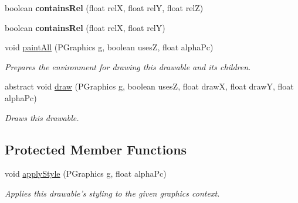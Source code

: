 \begin{DoxyCompactItemize}
\item 
\hypertarget{classhype_1_1core_1_1drawable_1_1_h_drawable_a8ae24b40927238f1be71ad4ff3120874}{boolean {\bfseries contains\-Rel} (float rel\-X, float rel\-Y, float rel\-Z)}\label{classhype_1_1core_1_1drawable_1_1_h_drawable_a8ae24b40927238f1be71ad4ff3120874}

\item 
\hypertarget{classhype_1_1core_1_1drawable_1_1_h_drawable_acd096b75e5eb22539a74db0528bf14a7}{boolean {\bfseries contains\-Rel} (float rel\-X, float rel\-Y)}\label{classhype_1_1core_1_1drawable_1_1_h_drawable_acd096b75e5eb22539a74db0528bf14a7}

\item 
void \hyperlink{classhype_1_1core_1_1drawable_1_1_h_drawable_ac66170a2cfce900a6ffa69696fd7c766}{paint\-All} (P\-Graphics g, boolean uses\-Z, float alpha\-Pc)
\begin{DoxyCompactList}\small\item\em Prepares the environment for drawing this drawable and its children. \end{DoxyCompactList}\item 
abstract void \hyperlink{classhype_1_1core_1_1drawable_1_1_h_drawable_a7a595e461771afe3957324bf42d2ef95}{draw} (P\-Graphics g, boolean uses\-Z, float draw\-X, float draw\-Y, float alpha\-Pc)
\begin{DoxyCompactList}\small\item\em Draws this drawable. \end{DoxyCompactList}\end{DoxyCompactItemize}
\subsection*{Protected Member Functions}
\begin{DoxyCompactItemize}
\item 
void \hyperlink{classhype_1_1core_1_1drawable_1_1_h_drawable_a0d27d893f24f8d96e4fb13ccc0024137}{apply\-Style} (P\-Graphics g, float alpha\-Pc)
\begin{DoxyCompactList}\small\item\em Applies this drawable's styling to the given graphics context. \end{DoxyCompactList}\end{DoxyCompactItemize}
